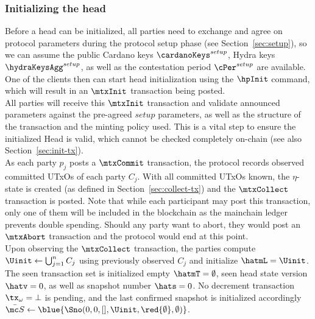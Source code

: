 \subsubsection{Initializing the head}

\quad Before a head can be initialized, all parties need
to exchange and agree on protocol parameters during the protocol setup phase
(see Section~\ref{sec:setup}), so we can assume the public Cardano keys
$\cardanoKeys^{setup}$, Hydra keys $\hydraKeysAgg^{setup}$, as well as the
contestation period $\cPer^{setup}$ are available. One of the clients then can
start head initialization using the $\hpInit$ command, which will result in an
$\mtxInit$ transaction being posted. \\

\quad All parties will receive this $\mtxInit$
transaction and validate announced parameters against the pre-agreed $setup$
parameters, as well as the structure of the transaction and the minting policy
used. This is a vital step to ensure the initialized Head is valid, which
cannot be checked completely on-chain (see also Section~\ref{sec:init-tx}). \\

\quad As each party $p_{j}$ posts a
$\mtxCommit$ transaction, the protocol records observed committed UTxOs of each
party $C_j$. With all committed UTxOs known, the $\eta$-state is created (as
defined in Section~\ref{sec:collect-tx}) and the $\mtxCollect$ transaction is
posted. Note that while each participant may post this transaction, only one of
them will be included in the blockchain as the mainchain ledger prevents double
spending. Should any party want to abort, they would post an $\mtxAbort$
transaction and the protocol would end at this point.\\

\quad Upon observing the $\mtxCollect$
transaction, the parties compute $\Uinit \gets \bigcup_{j=1}^{n} C_j$ using previously
observed $C_j$ and initialize $\hatmL = \Uinit$. The seen transaction set is
initialized empty $\hatmT = \emptyset$, seen head state version $\hatv = 0$, as well as
snapshot number $\hats = 0$. No 
decrement transaction $\tx_{\omega} = \bot$ is pending, and the last confirmed snapshot
is initialized accordingly $\bar{\mc S} \gets \blue{\Sno(0, 0, [], \Uinit, \red{\emptyset}, \emptyset)}$.

